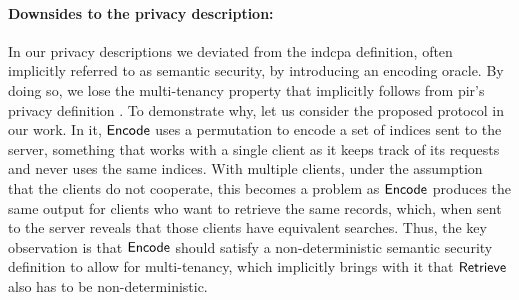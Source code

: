 \paragraph*{Downsides to the privacy description:} In our privacy descriptions we deviated from the \acrshort{indcpa} definition, often implicitly referred to as semantic security, by introducing an encoding oracle. By doing so, we lose the multi-tenancy property that implicitly follows from \acrshort{pir}'s privacy definition \cite{CCS:Henry17}. To demonstrate why, let us consider the proposed protocol in our work. In it, $ \mathsf{{Encode}} $ uses a permutation to encode a set of indices sent to the server, something that works with a single client as it keeps track of its requests and never uses the same indices. With multiple clients, under the assumption that the clients do not cooperate, this becomes a problem as $ \mathsf{{Encode}} $ produces the same output for clients who want to retrieve the same records, which, when sent to the server reveals that those clients have equivalent searches. Thus, the key observation is that $ \mathsf{{Encode}} $ should satisfy a non-deterministic semantic security definition to allow for multi-tenancy, which implicitly brings with it that $ \mathsf{{Retrieve}} $ also has to be non-deterministic.
